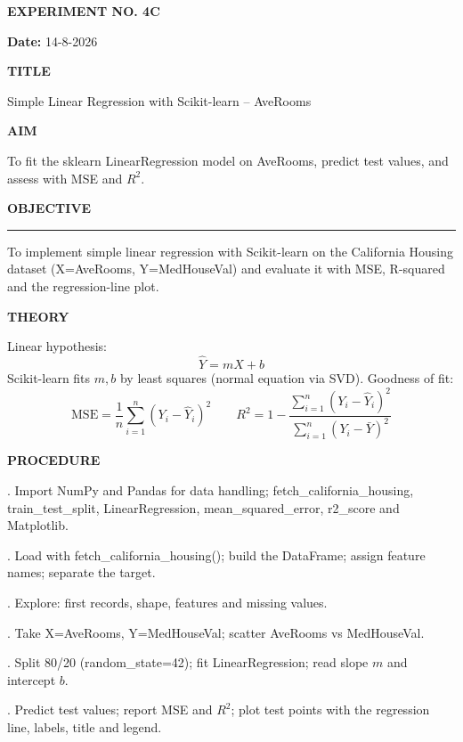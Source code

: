 \documentclass[11pt,twoside]{article}
\newcommand{\expheading}[1]{{\fontsize{14}{17}\selectfont\textbf{#1}\par}}
\newcommand{\fullrule}{\noindent\rule{\textwidth}{0.6pt}\par}
\begin{document}
{\setlength{\parskip}{1pt}\setlength{\abovedisplayskip}{2pt}\setlength{\belowdisplayskip}{2pt}
\begin{center}
\expheading{EXPERIMENT NO. 4C}
\end{center}
\vspace{2pt}

\noindent\textbf{Date:} 14-8-2026\par
\vspace{6pt}

\expheading{TITLE}
\vspace{4pt}
\noindent Simple Linear Regression with Scikit-learn -- AveRooms\par
\vspace{4pt}

\expheading{AIM}
\vspace{4pt}
\noindent To fit the sklearn LinearRegression model on AveRooms, predict test values, and assess with MSE and $R^2$. \par
\vspace{4pt}

\expheading{OBJECTIVE}
\vspace{2pt}
\fullrule
\vspace{4pt}
\noindent To implement simple linear regression with Scikit-learn on the California Housing dataset (X=AveRooms, Y=MedHouseVal) and evaluate it with MSE, R-squared and the regression-line plot. \par
\vspace{4pt}

\expheading{THEORY}
\vspace{4pt}
Linear hypothesis:
\[\hat{Y}=mX+b\]
Scikit-learn fits $m,b$ by least squares (normal equation via SVD).
Goodness of fit:
\[\mathrm{MSE}=\frac{1}{n}\sum_{i=1}^{n}(Y_i-\hat{Y}_i)^2\qquad R^2=1-\frac{\sum_{i=1}^{n}(Y_i-\hat{Y}_i)^2}{\sum_{i=1}^{n}(Y_i-\bar{Y})^2}\]
\vspace{4pt}

\expheading{PROCEDURE}
\vspace{4pt}
. Import NumPy and Pandas for data handling; fetch\_california\_housing, train\_test\_split, LinearRegression, mean\_squared\_error, r2\_score and Matplotlib.\par
{}. Load with fetch\_california\_housing(); build the DataFrame; assign feature names; separate the target.\par
{}. Explore: first records, shape, features and missing values.\par
{}. Take X=AveRooms, Y=MedHouseVal; scatter AveRooms vs MedHouseVal.\par
{}. Split 80/20 (random\_state=42); fit LinearRegression; read slope $m$ and intercept $b$.\par
{}. Predict test values; report MSE and $R^2$; plot test points with the regression line, labels, title and legend. \par
\vspace{4pt}

}
\end{document}
